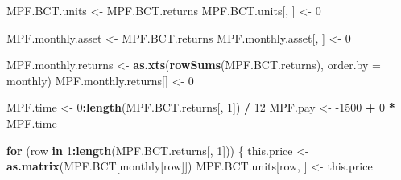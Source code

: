 \documentclass[
]{article}
\newenvironment{Shaded}{\begin{snugshade}}{\end{snugshade}}
\newcommand{\ControlFlowTok}[1]{\textcolor[rgb]{0.13,0.29,0.53}{\textbf{#1}}}
\newcommand{\DataTypeTok}[1]{\textcolor[rgb]{0.13,0.29,0.53}{#1}}
\newcommand{\DecValTok}[1]{\textcolor[rgb]{0.00,0.00,0.81}{#1}}
\newcommand{\KeywordTok}[1]{\textcolor[rgb]{0.13,0.29,0.53}{\textbf{#1}}}
\newcommand{\NormalTok}[1]{#1}
\newcommand{\OperatorTok}[1]{\textcolor[rgb]{0.81,0.36,0.00}{\textbf{#1}}}
\newcommand{\StringTok}[1]{\textcolor[rgb]{0.31,0.60,0.02}{#1}}
\begin{document}
\begin{Shaded}
\begin{Highlighting}[]
\NormalTok{MPF.BCT.units <-}\StringTok{ }\NormalTok{MPF.BCT.returns}
\NormalTok{MPF.BCT.units[, ] <-}\StringTok{ }\DecValTok{0}

\NormalTok{MPF.monthly.asset <-}\StringTok{ }\NormalTok{MPF.BCT.returns}
\NormalTok{MPF.monthly.asset[, ] <-}\StringTok{ }\DecValTok{0}

\NormalTok{MPF.monthly.returns <-}
\StringTok{  }\KeywordTok{as.xts}\NormalTok{(}\KeywordTok{rowSums}\NormalTok{(MPF.BCT.returns), }\DataTypeTok{order.by =}\NormalTok{ monthly)}
\NormalTok{MPF.monthly.returns[] <-}\StringTok{ }\DecValTok{0}

\NormalTok{MPF.time <-}\StringTok{ }\DecValTok{0}\OperatorTok{:}\KeywordTok{length}\NormalTok{(MPF.BCT.returns[, }\DecValTok{1}\NormalTok{]) }\OperatorTok{/}\StringTok{ }\DecValTok{12}
\NormalTok{MPF.pay <-}\StringTok{ }\DecValTok{-1500} \OperatorTok{+}\StringTok{ }\DecValTok{0} \OperatorTok{*}\StringTok{ }\NormalTok{MPF.time}

\ControlFlowTok{for}\NormalTok{ (row }\ControlFlowTok{in} \DecValTok{1}\OperatorTok{:}\KeywordTok{length}\NormalTok{(MPF.BCT.returns[, }\DecValTok{1}\NormalTok{])) \{}
\NormalTok{  this.price <-}\StringTok{ }\KeywordTok{as.matrix}\NormalTok{(MPF.BCT[monthly[row]])}
\NormalTok{  MPF.BCT.units[row, ] <-}\StringTok{ }\NormalTok{this.price}
  

\end{Highlighting}
\end{Shaded}
\end{document}
